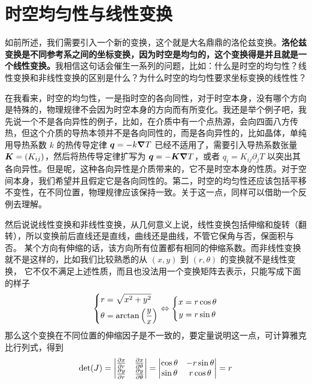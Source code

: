 \documentclass[12pt, a4paper, oneside]{ctexbook}
\begin{document}
\section{时空均匀性与线性变换}

如前所述，我们需要引入一个新的变换，这个就是大名鼎鼎的洛伦兹变换。\textbf{洛伦兹变换是不同参考系之间的坐标变换，因为时空是均匀的，这个变换得是并且就是一个线性变换。}我相信这句话会催生一系列的问题，比如：什么是时空的均匀性？线性变换和非线性变换的区别是什么？为什么时空的均匀性要求坐标变换的线性性？\par 
在我看来，时空的均匀性，一是指时空的各向同性，对于时空本身，没有哪个方向是特殊的，物理规律不会因为时空本身的方向而有所变化。我还是举个例子吧，我先说一个不是各向异性的例子，比如，在介质中有一个点热源，会向四面八方传热，但这个介质的导热本领并不是各向同性的，而是各向异性的，比如晶体，单纯用导热系数 $k$ 的热传导定律 $\vb*{q}=-k\grad{T}$ 已经不适用了，需要引入导热系数张量 $\vb*{K}=(K_{ij})$，然后将热传导定律扩写为 $\vb*{q}=-\vb*{K}\grad{T}$，或者 $q_{i}=K_{ij}\partial_{j}T$ 以突出其各向异性。但是呢，这种各向异性是介质带来的，它不是时空本身的性质。对于空间本身，我们希望并且假定它是各向同性的。第二，时空的均匀性还应该包括平移不变性，在不同位置，物理规律应该保持一致。关于这一点，同样可以借助一个反例去理解。\par 
然后说说线性变换和非线性变换，从几何意义上说，线性变换包括伸缩和旋转（翻转），所以变换前后直线还是直线，曲线还是曲线，不管它保角与否，保面积与否。
某个方向有伸缩的话，该方向所有位置都有相同的伸缩系数。而非线性变换就不是这样的，比如我们比较熟悉的从 $(x,y)$ 到 $(r,\theta)$ 的变换就不是线性变换，
它不仅不满足上述性质，而且也没法用一个变换矩阵去表示，只能写成下面的样子
\begin{equation}
	\left\{\begin{aligned}
		r&=\sqrt{x^{2}+y^{2}}\\
		\theta&=\arctan\qty(\frac{y}{x})
	\end{aligned}\right.\Leftrightarrow
	\left\{\begin{aligned}
		x&=r\cos\theta\\
		y&=r\sin\theta
	\end{aligned}\right.
\end{equation}
那么这个变换在不同位置的伸缩因子是不一致的，要定量说明这一点，可计算雅克比行列式，得到
\begin{equation}
	\det(J)=\begin{vmatrix}
		\pdv{x}{r} & \pdv{x}{\theta} \\
		\pdv{y}{r} & \pdv{y}{\theta}
	\end{vmatrix}=
	\begin{vmatrix}
		\cos\theta & -r\sin\theta\\
		\sin\theta & r\cos\theta
	\end{vmatrix}=r
\end{equation}
\end{document}
